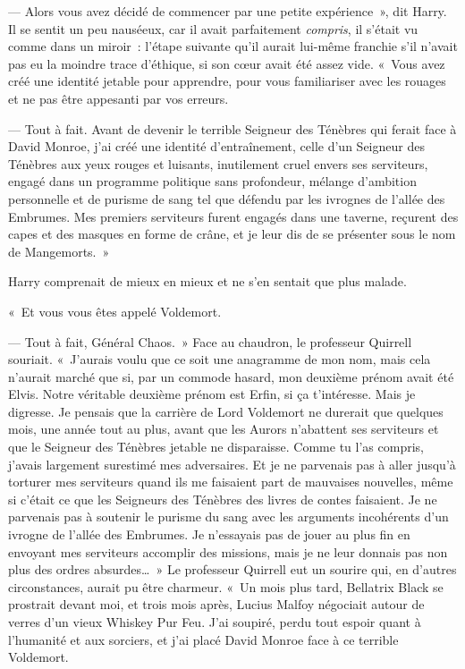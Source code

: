 --- Alors vous avez décidé de commencer par une petite expérience~», dit Harry. Il se sentit un peu nauséeux, car il avait parfaitement \emph{compris}, il s'était vu comme dans un miroir~: l'étape suivante qu'il aurait lui-même franchie s'il n'avait pas eu la moindre trace d'éthique, si son cœur avait été assez vide. «~Vous avez créé une identité jetable pour apprendre, pour vous familiariser avec les rouages et ne pas être appesanti par vos erreurs.

--- Tout à fait. Avant de devenir le terrible Seigneur des Ténèbres qui ferait face à David Monroe, j'ai créé une identité d'entraînement, celle d'un Seigneur des Ténèbres aux yeux rouges et luisants, inutilement cruel envers ses serviteurs, engagé dans un programme politique sans profondeur, mélange d'ambition personnelle et de purisme de sang tel que défendu par les ivrognes de l'allée des Embrumes. Mes premiers serviteurs furent engagés dans une taverne, reçurent des capes et des masques en forme de crâne, et je leur dis de se présenter sous le nom de Mangemorts.~»

Harry comprenait de mieux en mieux et ne s'en sentait que plus malade.

«~Et vous vous êtes appelé Voldemort.

--- Tout à fait, Général Chaos.~» Face au chaudron, le professeur Quirrell souriait. «~J'aurais voulu que ce soit une anagramme de mon nom, mais cela n'aurait marché que si, par un commode hasard, mon deuxième prénom avait été Elvis. Notre véritable deuxième prénom est Erfin, si ça t'intéresse. Mais je digresse. Je pensais que la carrière de Lord Voldemort ne durerait que quelques mois, une année tout au plus, avant que les Aurors n'abattent ses serviteurs et que le Seigneur des Ténèbres jetable ne disparaisse. Comme tu l'as compris, j'avais largement surestimé mes adversaires. Et je ne parvenais pas à aller jusqu'à torturer mes serviteurs quand ils me faisaient part de mauvaises nouvelles, même si c'était ce que les Seigneurs des Ténèbres des livres de contes faisaient. Je ne parvenais pas à soutenir le purisme du sang avec les arguments incohérents d'un ivrogne de l'allée des Embrumes. Je n'essayais pas de jouer au plus fin en envoyant mes serviteurs accomplir des missions, mais je ne leur donnais pas non plus des ordres absurdes…~» Le professeur Quirrell eut un sourire qui, en d'autres circonstances, aurait pu être charmeur. «~Un mois plus tard, Bellatrix Black se prostrait devant moi, et trois mois après, Lucius Malfoy négociait autour de verres d'un vieux Whiskey Pur Feu. J'ai soupiré, perdu tout espoir quant à l'humanité et aux sorciers, et j'ai placé David Monroe face à ce terrible Voldemort.

